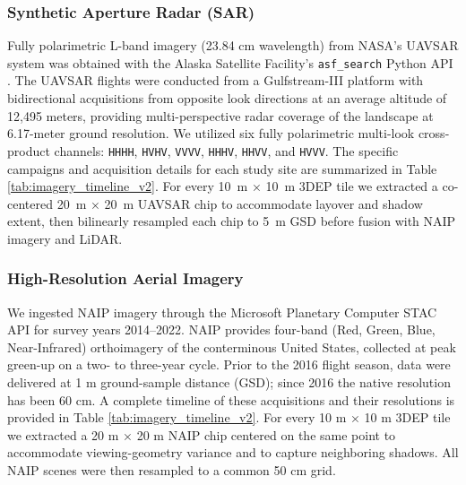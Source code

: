 \documentclass[remotesensing,article,submit,pdftex,moreauthors]{Definitions/mdpi}
\begin{document}
\subsubsection{Synthetic Aperture Radar (SAR)}
Fully polarimetric L-band imagery (23.84 cm wavelength) from NASA’s UAVSAR system was obtained with the Alaska Satellite Facility’s \texttt{asf\_search} Python API \citep{alaska_search}.  The UAVSAR flights were conducted from a Gulfstream-III platform with bidirectional acquisitions from opposite look directions at an average altitude of 12,495 meters, providing multi-perspective radar coverage of the landscape at 6.17-meter ground resolution. We utilized six fully polarimetric multi-look cross-product channels: \texttt{HHHH}, \texttt{HVHV}, \texttt{VVVV}, \texttt{HHHV}, \texttt{HHVV}, and \texttt{HVVV}. The specific campaigns and acquisition details for each study site are summarized in Table \ref{tab:imagery_timeline_v2}. For every \SI{10}{m} × \SI{10}{m} 3DEP tile we extracted a co-centered \SI{20}{m} × \SI{20}{m} UAVSAR chip to accommodate layover and shadow extent, then bilinearly resampled each chip to \SI{5}{m} GSD before fusion with NAIP imagery and LiDAR.


\subsubsection{High-Resolution Aerial Imagery}
We ingested NAIP imagery through the Microsoft Planetary Computer STAC API \citep{planetary_computer} for survey years 2014–2022.
NAIP provides four-band (Red, Green, Blue, Near-Infrared) orthoimagery of the conterminous United States, collected at peak green-up on a two- to three-year cycle.  Prior to the 2016 flight season, data were delivered at 1 m ground-sample distance (GSD); since 2016 the native resolution has been 60 cm. A complete timeline of these acquisitions and their resolutions is provided in Table \ref{tab:imagery_timeline_v2}. For every 10 m × 10 m 3DEP tile we extracted a 20 m × 20 m NAIP chip centered on the same point to accommodate viewing-geometry variance and to capture neighboring shadows.  All NAIP scenes were then resampled to a common 50 cm grid.
\end{document}
